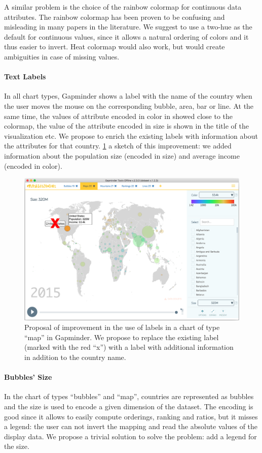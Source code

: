 A similar problem is the choice of the rainbow colormap for continuous data attributes.
The rainbow colormap has been proven to be confusing and misleading \cite{color-maps} in many papers in the literature.
We suggest to use a two-hue as the default for continuous values, since it allows a natural ordering of colors and it thus easier to invert.
Heat colormap would also work, but would create ambiguities in case of missing values.

\paragraph{Text Labels}
In all chart types, Gapminder shows a label with the name of the country when the user moves the mouse on the corresponding bubble, area, bar or line.
At the same time, the values of attribute encoded in color in showed close to the colormap, the value of the attribute encoded in size is shown in the title of the visualization etc.
We propose to enrich the existing labels with information about the attributes for that country.
\cref{fig:labels-custom} a sketch of this improvement:
we added information about the population size (encoded in size) and average income (encoded in color).

\begin{figure}[h]
	\centering
	\includegraphics[width=0.95\columnwidth]{figures/labels-custom}
	\caption{Proposal of improvement in the use of labels in a chart of type ``map'' in Gapminder. We propose to replace the existing label (marked with the red ``x'') with a label with additional information in addition to the country name.}
	\label{fig:labels-custom}
\end{figure}

\paragraph{Bubbles' Size}
In the chart of types ``bubbles'' and ``map'', countries are represented as bubbles and the size is used to encode a given dimension of the dataset.
The encoding is good since it allows to easily compute orderings, ranking and ratios, but it misses a legend:
the user can not invert the mapping and read the absolute values of the display data.
We propose a trivial solution to solve the problem: add a legend for the size.


